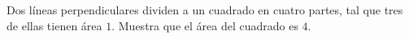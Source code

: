 Dos líneas perpendiculares dividen a un cuadrado en cuatro partes, tal que tres de ellas tienen área $1$. Muestra que el área del cuadrado es $4$.